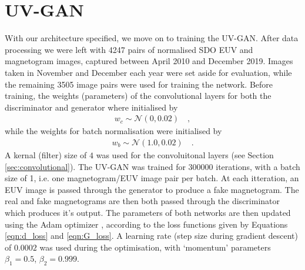 \documentclass[11pt,a4paper,onecolumn]{report}
\begin{document}
\section{UV-GAN}
With our architecture specified, we move on to training the UV-GAN. After data
processing we were left with 4247 pairs of normalised SDO EUV and magnetogram
images, captured between April 2010 and December 2019. Images taken in November
and December each year were set aside for evaluation, while the remaining 3505
image pairs were used for training the network. Before training, the weights
(parameters) of the convolutional layers for both the discriminator and
generator where initialised by
\begin{align}
  w_c \sim \mathcal{N}\left(0, 0.02\right) \quad ,
\end{align}
while the weights for batch normalisation were initialised by
\begin{align}
  w_b \sim \mathcal{N}\left(1.0, 0.02\right) \quad .
\end{align}
A kernal (filter) size of $4$ was used for the convoluitonal layers (see Section
\ref{sec:convolutional}). The UV-GAN was trained for $300000$ iterations, with a
batch size of 1, i.e. one magnetogram/EUV image pair per batch. At each
itteration, an EUV image is passed through the generator to produce a fake
magnetogram. The real and fake magnetograms are then both passed through the
discriminator which produces it's output. The parameters of both networks are
then updated using the Adam optimizer \citep{kingma_adam_2014}, according to the
loss functions given by Equations \ref{eqn:d_loss} and \ref{eqn:G_loss}. A
learning rate (step size during gradient descent) of $0.0002$ was used during
the optimisation, with `momentum' parameters $\beta_1 = 0.5$, $\beta_2 = 0.999$.\\
\end{document}
